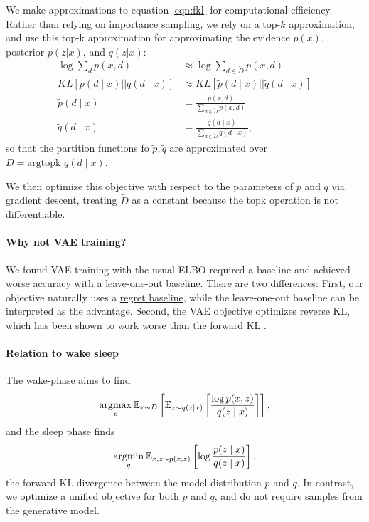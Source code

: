 \documentclass[11pt]{article}
\begin{document}
We make approximations to equation \ref{eqn:fkl} for computational efficiency.
Rather than relying on importance sampling, we rely on a top-$k$ approximation,
and use this top-k approximation for approximating the
evidence $p(x)$, posterior $p(z|x)$, and $q(z|x)$:
\begin{align*}
\log\sum_d p(x,d) &\approx \log\sum_{d\in \tilde{D}} p(x,d)\\
KL[p(d\mid x) || q(d \mid x)] &\approx KL[\tilde{p}(d\mid x) || \tilde{q}(d \mid x)]\\
\tilde{p}(d\mid x) &= \frac{p(x,d)}{\sum_{d \in \tilde{D}} p(x,d)}\\
\tilde{q}(d\mid x) &= \frac{q(d\mid x)}{\sum_{d \in \tilde{D}} q(d\mid x)},
\end{align*}
so that the partition functions fo $\tilde{p},\tilde{q}$ are approximated over
$\tilde{D} = \text{argtopk } q(d\mid x)$.

We then optimize this objective with respect to the parameters of $p$ and $q$ 
via gradient descent, treating $\tilde{D}$ as a constant because the topk operation
is not differentiable.

\paragraph{Why not VAE training?} We found VAE training with the usual ELBO
required a baseline and achieved worse accuracy with a leave-one-out baseline.
There are two differences:
First, our objective naturally uses a
\href{https://github.com/justinchiu/elbos-baselines}{regret baseline},
while the leave-one-out baseline can be interpreted as the advantage.
Second, the VAE objective optimizes reverse KL, which has
been shown to work worse than the forward KL \cite{fkl}.

\paragraph{Relation to wake sleep} The wake-phase aims to find
\begin{equation}
\operatorname*{argmax}_p \mathbb{E}_{x\sim D}\left[\mathbb{E}_{z\sim q(z\mid x)}\left[\frac{\log p(x,z)}{q(z\mid x)}\right]\right],
\end{equation}
and the sleep phase finds
\begin{equation}
\operatorname*{argmin}_q \mathbb{E}_{x,z\sim p(x,z)}\left[\log \frac{p(z\mid x)}{q(z\mid x)}\right],
\end{equation}
the forward KL divergence between the model distribution $p$ and $q$.
In contrast, we optimize a unified objective for both $p$ and $q$,
and do not require samples from the generative model.
\end{document}
